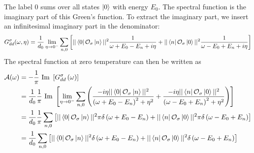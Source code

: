 \documentclass[10pt]{report}
\numberwithin{equation}{section}
\begin{document}
\begin{appendices}
The label 0 sums over all states \(\ket{0}\) with energy \(E_0\). The spectral function is the imaginary part of this Green's function. To extract the imaginary part, we insert an infinitesimal imaginary part in the denominator:
\begin{equation}\begin{aligned}
	G_{d d}^\sigma(\omega, \eta) = \frac{1}{d_0}\lim_{\eta \to 0^-}\sum_{n,0}\left[||\bra{0}\mathcal{O}_{\sigma}\ket{n}||^2\frac{1}{\omega + E_0 - E_n + i\eta} + ||\bra{n}\mathcal{O}_{\sigma}\ket{0}||^2\frac{1}{\omega - E_0 + E_n + i\eta}\right]\\
\end{aligned}\end{equation}
The spectral function at zero temperature can then be written as
\begin{equation}\begin{aligned}
	\mathcal{A(\omega)} &= -\frac{1}{\pi}\text{ Im }\left[G_{dd}^\sigma\left( \omega \right) \right] \\
			    &= \frac{1}{d_0}\frac{1}{\pi}\text{ Im }\left[\lim_{\eta \to 0^-}\sum_{n,0}\left(\frac{-i\eta ||\bra{0}\mathcal{O}_{\sigma}\ket{n}||^2}{\left(\omega + E_0 - E_n\right)^2 + \eta^2} + \frac{-i\eta ||\bra{n}\mathcal{O}_{\sigma}\ket{0}||^2}{\left(\omega - E_0 + E_n\right)^2 + \eta^2}\right)\right]\\
			    &= \frac{1}{d_0}\frac{1}{\pi}\sum_{n,0}\left[||\bra{0}\mathcal{O}_{\sigma}\ket{n}||^2\pi\delta\left(\omega + E_0 - E_n\right) + ||\bra{n}\mathcal{O}_{\sigma}\ket{0}||^2\pi\delta\left(\omega - E_0 + E_n\right)\right]\\
			    &= \frac{1}{d_0}\sum_{n,0}\left[||\bra{0}\mathcal{O}_{\sigma}\ket{n}||^2\delta\left(\omega + E_0 - E_n\right) + ||\bra{n}\mathcal{O}_{\sigma}\ket{0}||^2\delta\left(\omega - E_0 + E_n\right)\right]\\
\end{aligned}\end{equation}


\end{appendices}
\end{document}
